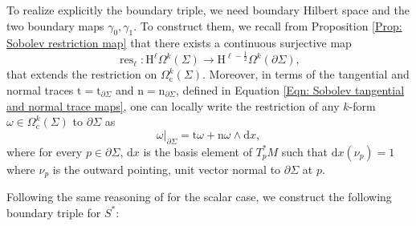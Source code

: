 \begin{remark}
	To realize explicitly the boundary triple, we need boundary Hilbert space and the two boundary maps $\gamma_0,\gamma_1$. To construct them, we recall from Proposition \ref{Prop: Sobolev restriction map} that there exists a continuous surjective map
	\begin{equation}
	\operatorname{res}_\ell:\mathrm{H}^\ell\Omega^k(\Sigma)\to\mathrm{H}^{\ell-\frac12}\Omega^k(\partial\Sigma),
	\end{equation}
	that extends the restriction on $\Omega_\mathrm{c}^k(\Sigma)$. Moreover, in terms of the tangential and normal traces $\mathrm{t}=\mathrm{t}_{\partial \Sigma}$ and $\mathrm{n}=\mathrm{n}_{\partial\Sigma}$, defined in Equation \ref{Eqn: Sobolev tangential and normal trace maps}, one can locally write the restriction of any $k$-form $\omega\in\Omega_\mathrm{c}^k(\Sigma)$ to $\partial\Sigma$ as
	\[	\omega|_{\partial\Sigma}=\mathrm{t}\omega+\mathrm{n}\omega\wedge\mathrm{d}x,	\]
	where for every $p\in\partial \Sigma$, $\mathrm{d}x$ is the basis element of $T^*_pM$ such that $\mathrm{d}x(\nu_p)=1$ where $\nu_p$ is the outward pointing, unit vector normal to $\partial\Sigma$ at $p$.
	
\end{remark}



Following the same reasoning of \cite{Dappiaggi-Drago-Ferreira-19} for the scalar case, we construct the following boundary triple for $S^*$:

